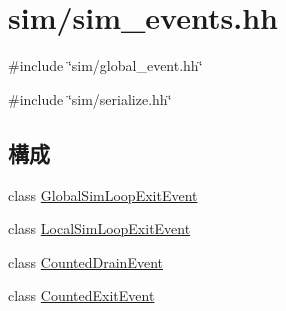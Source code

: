 \hypertarget{sim__events_8hh}{
\section{sim/sim\_\-events.hh}
\label{sim__events_8hh}
}
{\ttfamily \#include \char`\"{}sim/global\_\-event.hh\char`\"{}}\par
{\ttfamily \#include \char`\"{}sim/serialize.hh\char`\"{}}\par
\subsection*{構成}
\begin{DoxyCompactItemize}
\item 
class \hyperlink{classGlobalSimLoopExitEvent}{GlobalSimLoopExitEvent}
\item 
class \hyperlink{classLocalSimLoopExitEvent}{LocalSimLoopExitEvent}
\item 
class \hyperlink{classCountedDrainEvent}{CountedDrainEvent}
\item 
class \hyperlink{classCountedExitEvent}{CountedExitEvent}
\end{DoxyCompactItemize}
